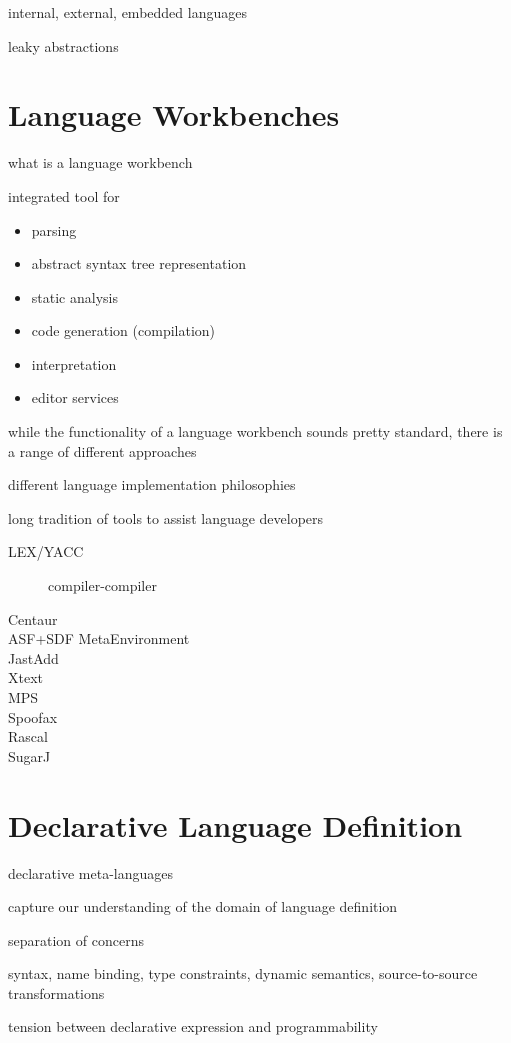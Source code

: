 internal, external, embedded languages

leaky abstractions

\section{Language Workbenches}

what is a language workbench

integrated tool for 

\begin{itemize}
  \item parsing
  \item abstract syntax tree representation
  \item static analysis
  \item code generation (compilation)
  \item interpretation
  \item editor services
\end{itemize}

while the functionality of a language workbench sounds pretty standard, there is
a range of different approaches 

different language implementation philosophies

long tradition of tools to assist language developers

\begin{description}
\item[LEX/YACC] compiler-compiler
\item[Centaur]
\item[ASF+SDF MetaEnvironment]
\item[JastAdd]
\item[Xtext]
\item[MPS]
\item[Spoofax]
\item[Rascal]
\item[SugarJ] 
\end{description}


\section{Declarative Language Definition}

declarative meta-languages

capture our understanding of the domain of language definition

separation of concerns

syntax, name binding, type constraints, dynamic semantics, source-to-source
transformations


tension between declarative expression and programmability

